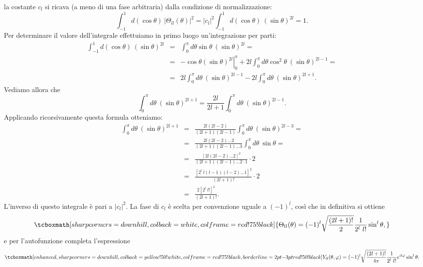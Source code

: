 \documentclass[a4paper,12pt,oneside]{book}
\begin{document}
la costante $c_l$ si ricava (a meno di una fase arbitraria) dalla condizione di normalizzazione:
	\begin{equation}
		\int _{-1} ^1 d(\cos \theta )\ \vert \Theta _{ll} (\theta ) \vert ^2 = \vert c_l \vert ^2 \int _{-1} ^1 d(\cos \theta )\ \left( \sin \theta \right) ^{2l} =1.
	\end{equation}
Per determinare il valore dell'integrale effettuiamo in primo luogo un'integrazione per parti:
	\begin{eqnarray}
\int _{-1} ^1 d(\cos \theta )\ (\sin \theta ) ^{2l} 			&=& \int _{0} ^{\pi} d\theta \sin \theta\ (\sin \theta ) ^{2l} = \nonumber \\
		&=& \left. -\cos \theta (\sin \theta ) ^{2l} \right\vert _0 ^{\pi} +2l\int _{0} ^{\pi} d\theta \cos ^2 \theta \ (\sin \theta ) ^{2l-1} = \nonumber \\
		&=&  2l\int _{0} ^{\pi} d\theta \ (\sin \theta ) ^{2l-1} - 2l\int _{0} ^{\pi} d\theta  \ (\sin \theta ) ^{2l+1} .
	\end{eqnarray}
Vediamo allora che 
	\begin{equation}
		\int _{0} ^{\pi} d\theta \ (\sin \theta ) ^{2l+1}=\frac{2l}{2l+1} \int _{0} ^{\pi} d\theta \ (\sin \theta ) ^{2l-1}.
	\end{equation}
Applicando ricorsivamente questa formula otteniamo:
	\begin{eqnarray}
		\int _{0} ^{\pi} d\theta \ (\sin \theta ) ^{2l+1} & = & \frac{2l(2l-2)}{(2l+1)(2l-1)} \int _{0} ^{\pi} d\theta \ (\sin \theta ) ^{2l-3} = \nonumber \\
		&=& \frac{2l(2l-2)\dots 2}{(2l+1)(2l-1)\dots 3} \int _{0} ^{\pi} d\theta \ \sin \theta =\nonumber \\
		&=& \frac{[2l(2l-2)\dots 2]^2}{(2l+1)(2l-1)\dots 2\cdot 1}\cdot 2 \nonumber \\
		& = &  \frac{[2^l\ l(l-1)(l-2)\dots 1]^2}{(2l+1)!}\cdot 2 \nonumber \\
		&=& \frac{2[2^l\ l!]^2}{(2l+1)!}.
	\end{eqnarray}
L'inverso di questo integrale è pari a $\vert c_l \vert ^2$. La fase di $c_l$ è scelta per convenzione uguale a $(-1)^l$, così che in definitiva si ottiene
	\begin{equation}
		\tcboxmath[sharp corners=downhill, colback=white, colframe=red!75!black]{
			\Theta _{ll} (\theta ) = (-1)^l \sqrt{\frac{(2l+1)!}{2}}\frac{1}{2^l\ l!}\sin^l \theta ,
			}
	\end{equation}
e per l'autofunzione completa l'espressione
	\begin{equation}
		\tcboxmath[enhanced, sharp corners=downhill, colback=yellow!50!white, colframe=red!75!black, borderline={2pt}{-3pt}{red!50!black}]{
			Y_{ll} (\theta , \varphi) = (-1)^l \sqrt{\frac{(2l+1)!}{4\pi}}\frac{1}{2^l\ l!}e^{il\varphi} \sin ^l \theta  .
			}
	\end{equation}\\
	
\end{document}
